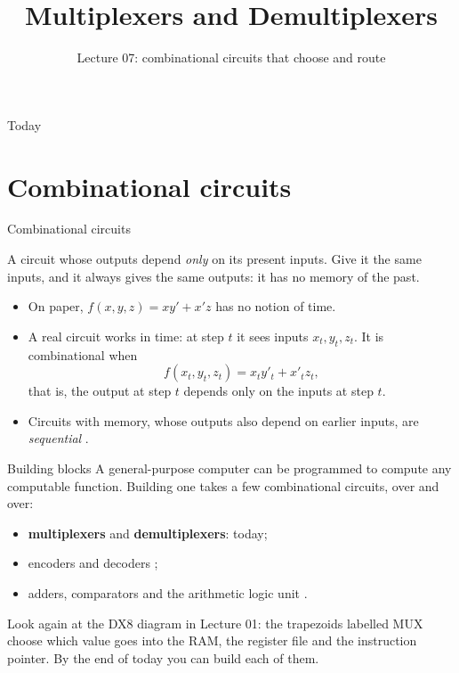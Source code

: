 \documentclass[10pt]{wosm-slides}
\title[Lecture 07 \textperiodcentered\ Multiplexers]{Multiplexers and Demultiplexers}
\subtitle{Lecture 07: combinational circuits that choose and route}
\begin{document}
\maketitle

\begin{frame}{Today}
  \tableofcontents
\end{frame}

\section{Combinational circuits}

\begin{frame}{Combinational circuits}
  \begin{definition}
    A circuit whose outputs depend \emph{only} on its present inputs. Give it the
    same inputs, and it always gives the same outputs: it has no memory of the past.
  \end{definition}

  \begin{itemize}
    \item On paper, $f(x, y, z) = xy' + x'z$ has no notion of time.
    \item A real circuit works in time: at step $t$ it sees inputs $x_t, y_t, z_t$.
      It is combinational when
      \[ f(x_t, y_t, z_t) = x_t y'_t + x'_t z_t , \]
      that is, the output at step $t$ depends only on the inputs at step $t$.
    \item Circuits with memory, whose outputs also depend on earlier inputs, are
      \emph{sequential} .
  \end{itemize}
\end{frame}

\begin{frame}{Building blocks}
  A general-purpose computer can be programmed to compute any computable function.
  Building one takes a few combinational circuits, over and over:

  \medskip
  \begin{itemize}
    \item \textbf{multiplexers} and \textbf{demultiplexers}: today;
    \item encoders and decoders ;
    \item adders, comparators and the arithmetic logic unit .
  \end{itemize}

  \bigskip
  \begin{remark}
    Look again at the DX8 diagram in Lecture 01: the trapezoids labelled MUX choose
    which value goes into the RAM, the register file and the instruction pointer.
    By the end of today you can build each of them.
  \end{remark}
\end{frame}
\end{document}

